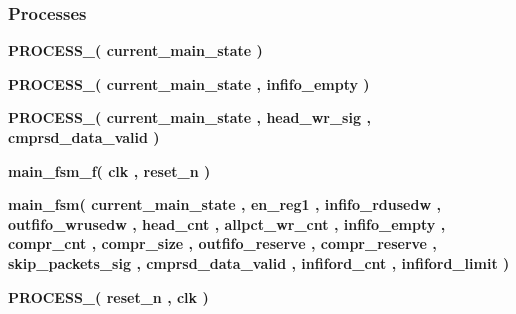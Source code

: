 \subsubsection*{Processes}
 \begin{DoxyCompactItemize}
\item 
{\bf P\+R\+O\+C\+E\+S\+S\+\_}{\bfseries  ( {\bfseries {\bfseries {\bf current\+\_\+main\+\_\+state}} \textcolor{vhdlchar}{ }} )}
\item 
{\bf P\+R\+O\+C\+E\+S\+S\+\_}{\bfseries  ( {\bfseries {\bfseries {\bf current\+\_\+main\+\_\+state}} \textcolor{vhdlchar}{ }} , {\bfseries {\bfseries {\bf infifo\+\_\+empty}} \textcolor{vhdlchar}{ }} )}
\item 
{\bf P\+R\+O\+C\+E\+S\+S\+\_}{\bfseries  ( {\bfseries {\bfseries {\bf current\+\_\+main\+\_\+state}} \textcolor{vhdlchar}{ }} , {\bfseries {\bfseries {\bf head\+\_\+wr\+\_\+sig}} \textcolor{vhdlchar}{ }} , {\bfseries {\bfseries {\bf cmprsd\+\_\+data\+\_\+valid}} \textcolor{vhdlchar}{ }} )}
\item 
{\bf main\+\_\+fsm\+\_\+f}{\bfseries  ( {\bfseries {\bfseries {\bf clk}} \textcolor{vhdlchar}{ }} , {\bfseries {\bfseries {\bf reset\+\_\+n}} \textcolor{vhdlchar}{ }} )}
\item 
{\bf main\+\_\+fsm}{\bfseries  ( {\bfseries {\bfseries {\bf current\+\_\+main\+\_\+state}} \textcolor{vhdlchar}{ }} , {\bfseries {\bfseries {\bf en\+\_\+reg1}} \textcolor{vhdlchar}{ }} , {\bfseries {\bfseries {\bf infifo\+\_\+rdusedw}} \textcolor{vhdlchar}{ }} , {\bfseries {\bfseries {\bf outfifo\+\_\+wrusedw}} \textcolor{vhdlchar}{ }} , {\bfseries {\bfseries {\bf head\+\_\+cnt}} \textcolor{vhdlchar}{ }} , {\bfseries {\bfseries {\bf allpct\+\_\+wr\+\_\+cnt}} \textcolor{vhdlchar}{ }} , {\bfseries {\bfseries {\bf infifo\+\_\+empty}} \textcolor{vhdlchar}{ }} , {\bfseries {\bfseries {\bf compr\+\_\+cnt}} \textcolor{vhdlchar}{ }} , {\bfseries {\bfseries {\bf compr\+\_\+size}} \textcolor{vhdlchar}{ }} , {\bfseries {\bfseries {\bf outfifo\+\_\+reserve}} \textcolor{vhdlchar}{ }} , {\bfseries {\bfseries {\bf compr\+\_\+reserve}} \textcolor{vhdlchar}{ }} , {\bfseries {\bfseries {\bf skip\+\_\+packets\+\_\+sig}} \textcolor{vhdlchar}{ }} , {\bfseries {\bfseries {\bf cmprsd\+\_\+data\+\_\+valid}} \textcolor{vhdlchar}{ }} , {\bfseries {\bfseries {\bf infiford\+\_\+cnt}} \textcolor{vhdlchar}{ }} , {\bfseries {\bfseries {\bf infiford\+\_\+limit}} \textcolor{vhdlchar}{ }} )}
\item 
{\bf P\+R\+O\+C\+E\+S\+S\+\_}{\bfseries  ( {\bfseries {\bfseries {\bf reset\+\_\+n}} \textcolor{vhdlchar}{ }} , {\bfseries {\bfseries {\bf clk}} \textcolor{vhdlchar}{ }} )}

\end{DoxyCompactItemize}
